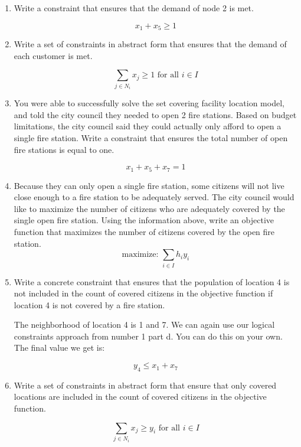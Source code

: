 \documentclass[letterpaper,oneside,12pt]{article}%
\newcommand{\blu}{\color{blue}}
\begin{document}
\begin{enumerate}
\begin{enumerate}
\item  Write a constraint that ensures that the demand of node 2 is met.  

{
\blu
\[
x_1 + x_5 \geq 1
\]
}

\item  Write a set of constraints in abstract form that ensures that the demand of each customer is met.

{
\blu

\[
\sum_{j \in N_i} x_j \geq 1 \text{ for all $i \in I$}
\]
}


\item  You were able to successfully solve the set covering facility location model, and told the city council they needed to open 2 fire stations.  Based on budget limitations, the city council said they could actually only afford to open a single fire station.  Write a constraint that ensures the total number of open fire stations is equal to one.

{
\blu
\[
x_1 + x_5 + x_7 = 1
\]
}

\item  Because they can only open a single fire station, some citizens will not live close enough to a fire station to be adequately served.  The city council would like to maximize the number of citizens who are adequately covered by the single open fire station.  Using the information above, write an objective function that maximizes the number of citizens covered by the open fire station.
{
\blu
\[
\text{maximize: } \sum_{i \in I} h_i y_i
\]
}

\item  Write a concrete constraint that ensures that the population of location 4 is not included in the count of covered citizens in the objective function if location 4 is not covered by a fire station.

{
\blu
The neighborhood of location 4 is 1 and 7. We can again use our logical constraints approach from number 1 part d. You can do this on your own. The final value we get is:

\[
y_4 \leq x_1 + x_7
\]

}

\item  Write a set of constraints in abstract form that ensure that only covered locations are included in the count of covered citizens in the objective function.

{
\blu

\[
\sum_{j \in N_i} x_j \geq y_i \text{ for all $i \in I$}
\]

}
\end{enumerate}
\end{enumerate}
\end{document}

